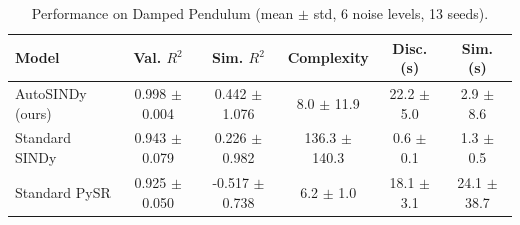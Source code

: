 \begin{table}[htbp]
\centering
\small
\renewcommand{\arraystretch}{1.2}
\caption{Performance on Damped Pendulum (mean $\pm$ std, 6 noise levels, 13 seeds).}
\label{tab:autosindy_damped_pendulum}
\begin{tabular}{lccccc}
\toprule
Model & Val. $R^2$ & Sim. $R^2$ & Complexity & Disc. (s) & Sim. (s) \\
\midrule
AutoSINDy (ours) & 0.998 $\pm$ 0.004 & 0.442 $\pm$ 1.076 & 8.0 $\pm$ 11.9 & 22.2 $\pm$ 5.0 & 2.9 $\pm$ 8.6 \\
Standard SINDy & 0.943 $\pm$ 0.079 & 0.226 $\pm$ 0.982 & 136.3 $\pm$ 140.3 & 0.6 $\pm$ 0.1 & 1.3 $\pm$ 0.5 \\
Standard PySR & 0.925 $\pm$ 0.050 & -0.517 $\pm$ 0.738 & 6.2 $\pm$ 1.0 & 18.1 $\pm$ 3.1 & 24.1 $\pm$ 38.7 \\
\bottomrule
\end{tabular}
\end{table}